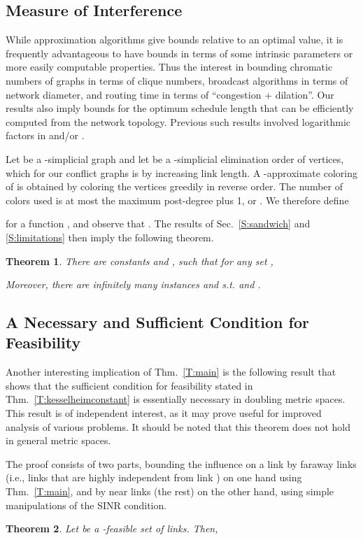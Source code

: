 \documentclass[11pt]{article}
\newcommand{\subsec}[1]{\subsection{#1}}
\newtheorem{theorem}{Theorem}
\begin{document}
\subsec{Measure of Interference}
While approximation algorithms give bounds relative to an optimal value, it is frequently advantageous to have bounds in
terms of some intrinsic parameters or more easily computable properties. Thus the interest in bounding chromatic numbers
of graphs in terms of clique numbers, broadcast algorithms in terms of network diameter, and routing time in terms of
``congestion + dilation''. Our results also imply bounds for the optimum schedule length that can be efficiently
computed from the network topology.  
Previous such results involved logarithmic factors in  and/or  \cite{fangkeslinear,kesvokdistributed}.

Let  be a -simplicial graph and let  be a -simplicial elimination order of vertices, which
for our conflict graphs is by increasing link length.  A -approximate coloring of  is obtained by coloring the
vertices greedily in reverse order.  
The number of colors used is at most the maximum post-degree plus 1, or
. We therefore define
  
for a function , and observe that .
The results of Sec.\ \ref{S:sandwich} and \ref{S:limitations} then imply the following theorem.

\begin{theorem}
There are constants  and , such that for any set ,

Moreover, there are infinitely many instances  and  s.t.  and .
\end{theorem}

\subsec{A Necessary and Sufficient Condition for Feasibility}
\label{S:necsuf}
Another interesting implication of Thm.\ \ref{T:main} is the following result that shows that the sufficient condition for feasibility stated in Thm.\ \ref{T:kesselheimconstant} is essentially necessary in doubling metric spaces. 
This result is of independent interest, as it may prove useful for improved analysis of various problems.
It should be noted that this theorem does not hold in general metric spaces.

The proof consists of two parts, bounding the influence on a link  by faraway links (i.e., links that are highly independent from link ) on one hand using Thm.\ \ref{T:main}, and by near links (the rest) on the other hand, using simple manipulations of the SINR condition.
\begin{theorem}\label{T:necessary}
Let  be a -feasible set of links. Then,

 \end{theorem}
\end{document}
